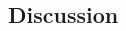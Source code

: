 \begin{CJK}{UTF8}{gbsn}


\section{Discussion}















                                                          \end{CJK}
